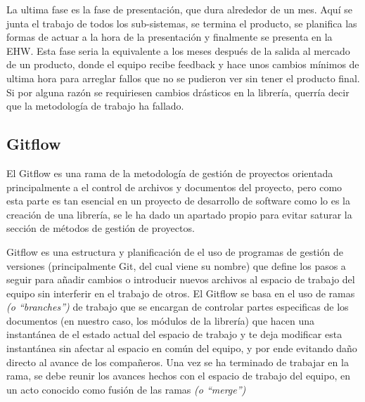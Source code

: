 \documentclass{report}
\begin{document}
La ultima fase es la fase de presentación, que dura alrededor de un mes. Aquí se junta el trabajo de todos los sub-sistemas, se termina el producto, se planifica las formas de actuar a la hora de la presentación y finalmente se presenta en la EHW. Esta fase seria la equivalente a los meses después de la salida al mercado de un producto, donde el equipo recibe feedback y hace unos cambios mínimos de ultima hora para arreglar fallos que no se pudieron ver sin tener el producto final. Si por alguna razón se requiriesen cambios drásticos en la librería, querría decir que la metodología de trabajo ha fallado. 

\subsection{Gitflow}
El Gitflow es una rama de la metodología de gestión de proyectos orientada principalmente a el control de archivos y documentos del proyecto, pero como esta parte es tan esencial en un proyecto de desarrollo de software como lo es la creación de una librería, se le ha dado un apartado propio para evitar saturar la sección de métodos de gestión de proyectos. 
\par \vspace{0.3 cm}
Gitflow es una estructura y planificación de el uso de programas de gestión de versiones (principalmente Git, del cual viene su nombre) que define los pasos a seguir para añadir cambios o introducir nuevos archivos al espacio de trabajo del equipo sin interferir en el trabajo de otros.
El Gitflow se basa en el uso de ramas \textit{(o ``branches'')} de trabajo que se encargan de controlar partes especificas de los documentos (en nuestro caso, los módulos de la librería) que hacen una instantánea de el estado actual del espacio de trabajo y te deja modificar esta instantánea sin afectar al espacio en común del equipo, y por ende evitando daño directo al avance de los compañeros. Una vez se ha terminado de trabajar en la rama, se debe reunir los avances hechos con el espacio de trabajo del equipo, en un acto conocido como fusión de las ramas \textit{(o ``merge'')}\par \vspace{0.3 cm}
\end{document}
